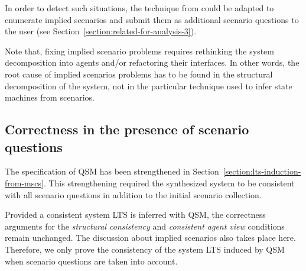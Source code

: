 In order to detect such situations, the technique from \cite{Uchitel:2004} could be adapted to enumerate implied scenarios and submit them as additional scenario questions to the user (see Section~\ref{section:related-for-analysis-3}). 

Note that, fixing implied scenario problems requires rethinking the system decomposition into agents and/or refactoring their interfaces. In other words, the root cause of implied scenarios problems has to be found in the structural decomposition of the system, not in the particular technique used to infer state machines from scenarios. 


\subsection{Correctness in the presence of scenario questions\label{subsection:proof-with-scenario-questions}}

The specification of QSM has been strengthened in Section~\ref{section:lts-induction-from-mscs}. This strengthening required the synthesized system to be consistent with all scenario questions in addition to the initial scenario collection. 

Provided a consistent system LTS is inferred with QSM, the correctness arguments for the \emph{structural consistency} and \emph{consistent agent view} conditions remain unchanged. The discussion about implied scenarios also takes place here. Therefore, we only prove the consistency of the system LTS induced by QSM when scenario questions are taken into account.

